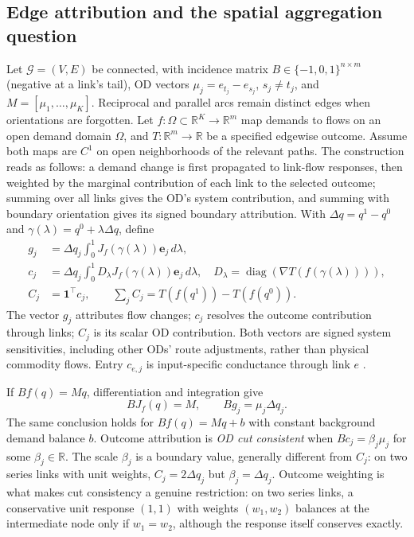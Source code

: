 \documentclass[a4paper,fleqn]{cas-sc}
\newcommand{\R}{\mathbb{R}}
\begin{document}
\subsection{Edge attribution and the spatial aggregation question}
Let $\mathcal G=(V,E)$ be connected, with incidence matrix
$B\in\{-1,0,1\}^{n\times m}$ (negative at a link's tail), OD vectors
$\mu_j=e_{t_j}-e_{s_j}$, $s_j\ne t_j$, and $M=[\mu_1,\ldots,\mu_K]$.
Reciprocal and parallel arcs remain distinct edges when orientations are
forgotten. Let $f:\Omega\subset\R^K\to\R^m$ map demands to flows on an
open demand domain $\Omega$, and
$T:\R^m\to\R$ be a specified edgewise outcome. Assume both maps are $C^1$
on open neighborhoods of the relevant paths. The construction reads as
follows: a demand change is first propagated to link-flow responses,
then weighted by the marginal contribution of each link to the selected
outcome; summing over all links gives the OD's system contribution, and
summing with boundary orientation gives its signed boundary attribution.
With $\Delta q=q^1-q^0$ and
$\gamma(\lambda)=q^0+\lambda\Delta q$, define
\begin{align}
g_j&=\Delta q_j\int_0^1 J_f(\gamma(\lambda))\mathbf e_j\,d\lambda,
\label{eq:Gdef}\\
c_j&=\Delta q_j\int_0^1 D_\lambda J_f(\gamma(\lambda))\mathbf e_j\,d\lambda,
\quad D_\lambda=\operatorname{diag}(\nabla T(f(\gamma(\lambda)))),
\label{eq:Cdef}\\
C_j&=\mathbf1^\top c_j,\qquad
\sum_j C_j=T(f(q^1))-T(f(q^0)).\label{eq:Cscalar}
\end{align}
The vector $g_j$ attributes flow changes; $c_j$ resolves the outcome
contribution through links; $C_j$ is its scalar OD contribution. Both
vectors are signed system sensitivities, including other ODs' route
adjustments, rather than physical commodity flows. Entry $c_{e,j}$ is
input-specific conductance through link $e$
\citep{dhamdhere2019important}.\label{sec:whyC}

If $Bf(q)=Mq$, differentiation and integration give
\begin{equation}
BJ_f(q)=M,\qquad Bg_j=\mu_j\Delta q_j.\label{eq:anchorchain}
\end{equation}
The same conclusion holds for $Bf(q)=Mq+b$ with constant background demand
balance $b$. Outcome attribution is \emph{OD cut consistent} when
$Bc_j=\beta_j\mu_j$ for some $\beta_j\in\R$.
The scale $\beta_j$ is a boundary value, generally different from $C_j$:
on two series links with unit weights, $C_j=2\Delta q_j$ but
$\beta_j=\Delta q_j$. Outcome weighting is what makes cut consistency a
genuine restriction: on two series links, a conservative unit response
$(1,1)$ with weights $(w_1,w_2)$ balances at the intermediate node only
if $w_1=w_2$, although the response itself conserves exactly.
\end{document}
